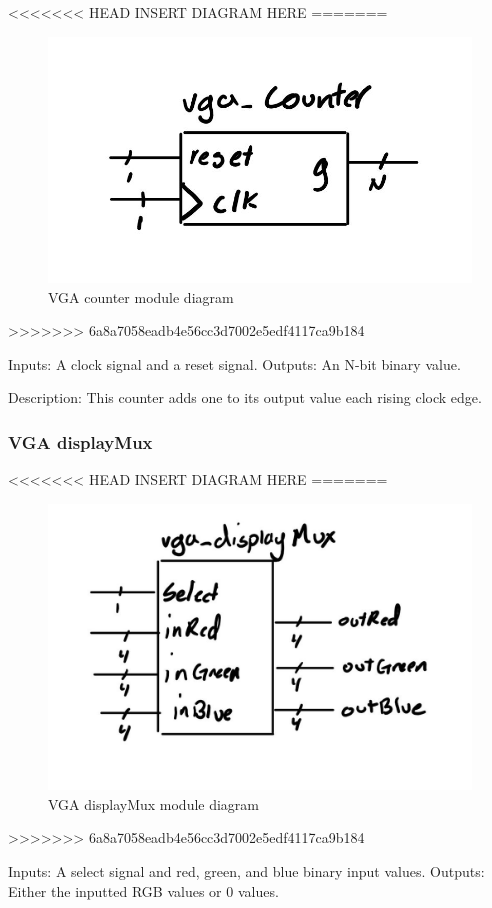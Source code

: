 \documentclass[a4paper]{article}
\begin{document}
<<<<<<< HEAD
INSERT DIAGRAM HERE
=======
\begin{figure}[H]
    \includegraphics[width=0.8 \linewidth]{images/vga_counter.JPG}
    \caption{VGA counter module diagram}
    \label{vgaCounterDiagram}
\end{figure}
>>>>>>> 6a8a7058eadb4e56cc3d7002e5edf4117ca9b184

Inputs: A clock signal and a reset signal.
Outputs: An N-bit binary value.

Description: This counter adds one to its output value each rising clock edge.

\subsubsection{VGA displayMux}

<<<<<<< HEAD
INSERT DIAGRAM HERE
=======
\begin{figure}[H]
    \includegraphics[width=0.8 \linewidth]{images/vga_displayMux.JPG}
    \caption{VGA displayMux module diagram}
    \label{vgaDisplayMuxDiagram}
\end{figure}
>>>>>>> 6a8a7058eadb4e56cc3d7002e5edf4117ca9b184

Inputs: A select signal and red, green, and blue binary input values.
Outputs: Either the inputted RGB values or 0 values.
\end{document}
